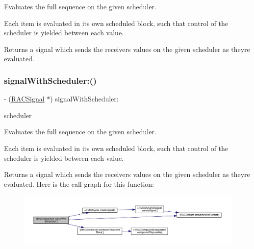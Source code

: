 Evaluates the full sequence on the given scheduler.

Each item is evaluated in its own scheduled block, such that control of the scheduler is yielded between each value.

Returns a signal which sends the receiver\textquotesingle{}s values on the given scheduler as they\textquotesingle{}re evaluated. \mbox{\label{interface_r_a_c_sequence_ac2b08c9ed5f9cae5c96f61578e9c3f5d}} 
\subsubsection{\texorpdfstring{signal\+With\+Scheduler\+:()}{signalWithScheduler:()}\hspace{0.1cm}{\footnotesize\ttfamily [2/3]}}
{\footnotesize\ttfamily -\/ (\mbox{\hyperlink{interface_r_a_c_signal}{R\+A\+C\+Signal}} $\ast$) signal\+With\+Scheduler\+: \begin{DoxyParamCaption}\item[{(\mbox{\hyperlink{interface_r_a_c_scheduler}{R\+A\+C\+Scheduler}} $\ast$)}]{scheduler }\end{DoxyParamCaption}}

Evaluates the full sequence on the given scheduler.

Each item is evaluated in its own scheduled block, such that control of the scheduler is yielded between each value.

Returns a signal which sends the receiver\textquotesingle{}s values on the given scheduler as they\textquotesingle{}re evaluated. Here is the call graph for this function\+:\nopagebreak
\begin{figure}[H]
\begin{center}
\leavevmode
\includegraphics[width=350pt]{interface_r_a_c_sequence_ac2b08c9ed5f9cae5c96f61578e9c3f5d_cgraph}
\end{center}
\end{figure}
\mbox{\label{interface_r_a_c_sequence_ac2b08c9ed5f9cae5c96f61578e9c3f5d}} 
